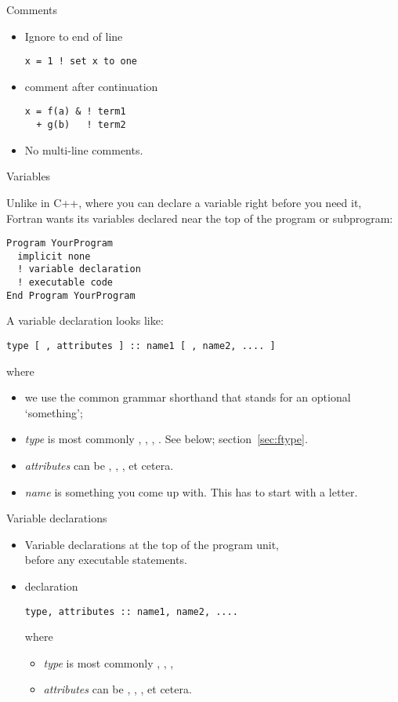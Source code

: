 \begin{slide}{Comments}
  \label{sl:fcomment}
  \begin{itemize}
  \item Ignore to end of line
\begin{lstlisting}
x = 1 ! set x to one
\end{lstlisting}
\item comment after continuation
\begin{lstlisting}
x = f(a) & ! term1 
  + g(b)   ! term2
\end{lstlisting}
  \item No multi-line comments.
  \end{itemize}
\end{slide}

 {Variables}

Unlike in C++, where you can declare a variable right before you need
it, Fortran wants its variables declared near the top of the program
or subprogram:
\begin{lstlisting}
Program YourProgram
  implicit none
  ! variable declaration
  ! executable code
End Program YourProgram
\end{lstlisting}
A variable declaration looks like:
\begin{lstlisting}
type [ , attributes ] :: name1 [ , name2, .... ]
\end{lstlisting}
where
\begin{itemize}
\item we use the common grammar shorthand that \n{[ something ]}
  stands for an optional `something';
\item \textit{type} is most commonly , , ,
  . See below; section~\ref{sec:ftype}.
\item \textit{attributes} can be , ,
  ,  et cetera.
\item \textit{name} is something you come up with. This has to start
  with a letter.
\end{itemize}

\begin{slide}{Variable declarations}
  \label{sl:fvars}
  \begin{itemize}
  \item Variable declarations at the top of the program unit,\\
    before any executable statements.
  \item declaration
\begin{lstlisting}
type, attributes :: name1, name2, ....
\end{lstlisting}
where
\begin{itemize}
\item \textit{type} is most commonly , , ,
\item \textit{attributes} can be , ,
  ,  et cetera.
  \end{itemize}
\end{itemize}
\end{slide}


